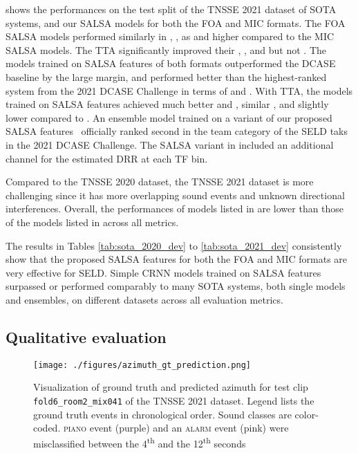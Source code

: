 \documentclass[journal]{IEEEtran}
\newcommand{\ER}{\xspace}
\newcommand{\Fone}{\xspace}
\newcommand{\LE}{\xspace}
\newcommand{\LR}{\xspace}
\begin{document}
 shows the performances on the test split of the TNSSE 2021 dataset of SOTA systems, and our SALSA models for both the FOA and MIC formats. The FOA SALSA models performed similarly in \ER, \LE, \LR as and higher \Fone compared to the MIC SALSA models. The TTA significantly improved their \ER, \Fone, and \LE but not \LR. The models trained on SALSA features of both formats outperformed the DCASE baseline by the large margin, and performed better than the highest-ranked system from the 2021 DCASE Challenge \cite{Shimada2021EnsembleDetection} in terms of \ER and \Fone. With TTA, the models trained on SALSA features achieved much better \ER and \Fone, similar \LE, and slightly lower \LR compared to \cite{Shimada2021EnsembleDetection}. An ensemble model trained on a variant of our proposed SALSA features~\cite{Nguyen2021DCASEDetection} officially ranked second in the team category of the SELD taks in the 2021 DCASE Challenge. The SALSA variant in \cite{Nguyen2021DCASEDetection} included an additional channel for the estimated DRR at each TF bin. 

Compared to the TNSSE 2020 dataset, the TNSSE 2021 dataset is more challenging since it has more overlapping sound events and unknown directional interferences. Overall, the performances of models listed in  are lower than those of the models listed in  across all metrics.

The results in Tables \ref{tab:sota_2020_dev} to \ref{tab:sota_2021_dev} consistently show that the proposed SALSA features for both the FOA and MIC formats are very effective for SELD. Simple CRNN models trained on SALSA features surpassed or performed comparably to many SOTA systems, both single models and ensembles, on different datasets across all evaluation metrics.

\subsection{Qualitative evaluation}

\begin{figure}[tb]
    \centering
    \texttt{[image: ./figures/azimuth\_gt\_prediction.png]}
    \vspace{-0.5cm}
    \caption{Visualization of ground truth and predicted azimuth for test clip \texttt{fold6\_room2\_mix041} of the TNSSE 2021 dataset. Legend lists the ground truth events in chronological order. Sound classes are color-coded. 
    {\textsc{piano} event (purple) and an \textsc{alarm} event (pink) were misclassified between the \num{4}\textsuperscript{th} and the \num{12}\textsuperscript{th} seconds}}
\label{fig:gt_pred_visualization}
\end{figure} 
\end{document}
